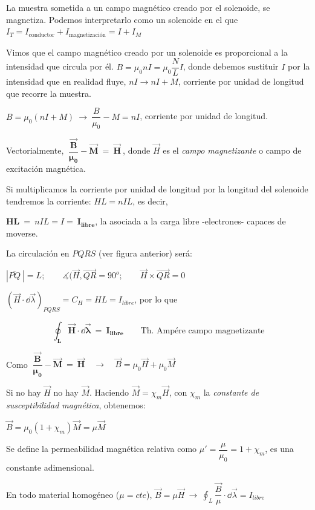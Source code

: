 La muestra sometida a un campo magnético creado por el solenoide, se magnetiza. Podemos interpretarlo como un solenoide en el que $I_T=I_{\text{conductor}}+I_{\text{magnetización}}=I+I_M$

Vimos que el campo magnético creado por un solenoide es proporcional a la intensidad que circula por él.
$B=\mu_0 n I=\mu_0 \dfrac N L I$, donde debemos sustituir $I$ por la intensidad que en realidad fluye, $nI \to nI+M$, corriente por unidad de longitud que recorre la muestra.

$B=\mu_0 (nI+M) \ \to \ \dfrac B{\mu_0}-M=nI$, corriente por unidad de longitud.

Vectorialmente, $\ \boldsymbol{ \dfrac {\vec B}{\mu_0}-\vec M\ = \ \vec H } \ $, donde $\vec H$ es el \emph{campo magnetizante} o campo de excitación magnética.

Si multiplicamos la corriente por unidad de longitud por la longitud del solenoide tendremos la corriente: $HL=nIL$, es decir,

$\boldsymbol{HL\ =} \ nIL = I = \ \boldsymbol{I_{libre}}$, la asociada a la carga libre -electrones- capaces de moverse.

La circulación en $PQRS$ (ver figura anterior) será:

$| \overline{PQ} \ |=L; \qquad  \measuredangle(\vec H, \overrightarrow{QR}=90^o; \qquad  \vec H \times \overrightarrow{QR}=0$

$(\vec H \cdot \dd \vec \lambda)_{PQRS}=C_H=HL=I_{libre}$, por lo que

\begin{equation}
\boldsymbol{\oint_L \vec H \cdot \dd \vec \lambda \ = \ I_{libre}}	\qquad \text{Th. Ampére campo magnetizante}
\end{equation}


Como $\ \boldsymbol{ \dfrac {\vec B}{\mu_0}-\vec M\ = \ \vec H } \quad  \to \quad \vec B=\mu_0 \vec H +  \mu_0 \vec M $

Si no hay $\vec H$ no hay $\vec M$. Haciendo $\vec M = \chi_m \vec H$, con $\chi_m$ la \emph{constante de susceptibilidad magnética}, obtenemos:

$\vec B=\mu_0 (1+\chi_m) \vec M = \mu \vec M$

Se define la permeabilidad magnética relativa como $\mu'= \dfrac{\mu}{\mu_0}=1+\chi_m$, es una constante adimensional.

En todo material homogéneo ($\mu=cte$), $\displaystyle \vec B = \mu \vec H \ \to \ \oint_L \dfrac {\vec B}{\mu} \cdot \dd \vec \lambda = I_{libre}$

